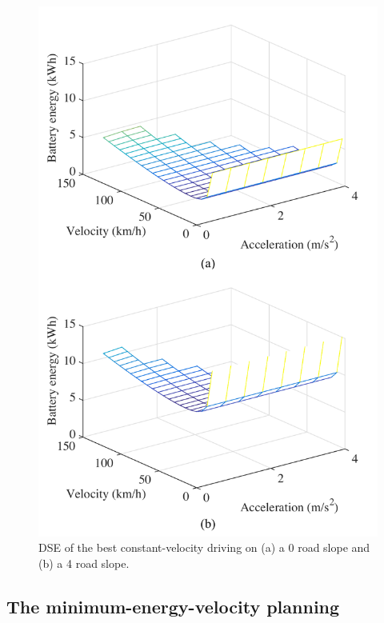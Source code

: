 \documentclass{IEEEtran}
\begin{document}
\begin{figure} %
\centering
\includegraphics[width=0.95\hsize]{Figures/Design_space_exploration.pdf}
\caption{DSE of the best constant-velocity driving on (a) a 0 road slope and (b) a 4 road slope.}
\label{fig:DSE}
\end{figure} 

\subsection{The minimum-energy-velocity planning} \label{subsec:variable drive}
\end{document}
